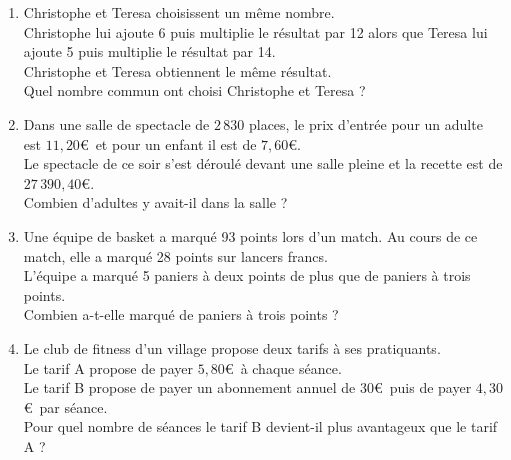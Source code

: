 {\begin{Exercice}
\begin{enumerate}[itemsep=1em]
\begin{minipage}[t]{\linewidth}
\begin{center}
	\end{center}\end{minipage}
	\item \begin{minipage}[t]{\linewidth}Christophe et Teresa choisissent un même nombre.\\ Christophe lui ajoute 6 puis multiplie le résultat par 12 alors que Teresa lui ajoute 5 puis multiplie le résultat par 14.\\Christophe et Teresa obtiennent le même résultat.\\Quel nombre commun ont choisi Christophe et Teresa ?\end{minipage}
	\item \begin{minipage}[t]{\linewidth}Dans une salle de spectacle de $2\,830$ places, le prix d'entrée pour un adulte est $11{,}20$€~et pour un enfant il est de $7{,}60$€.\\Le spectacle de ce soir s'est déroulé devant une salle pleine et la recette est de $27\,390{,}40$€.\\Combien d'adultes y avait-il dans la salle ?\end{minipage}
	\item \begin{minipage}[t]{\linewidth}Une équipe de basket a marqué 93 points lors d'un match. Au cours de ce match, elle a marqué 28 points sur lancers francs.\\L'équipe a marqué 5 paniers à deux points de plus que de paniers à trois points.\\Combien a-t-elle marqué de paniers à trois points ?\end{minipage}
	\item \begin{minipage}[t]{\linewidth}Le club de fitness d'un village propose deux tarifs à ses pratiquants.\\Le tarif A propose de payer $5{,}80$€~à chaque séance.\\Le tarif B propose de payer un abonnement annuel de $30$€~puis de payer $4{,}30$€~par séance.\\Pour quel nombre de séances le tarif B devient-il plus avantageux que le tarif A ?\end{minipage}

\end{enumerate}
\end{Exercice}}
